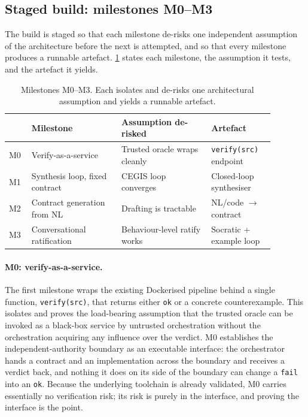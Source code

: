 \subsection{Staged build: milestones M0--M3}
\label{subsec:inst-milestones}

The build is staged so that each milestone de-risks one independent assumption of the architecture before the next is attempted, and so that every milestone produces a runnable artefact. \cref{tab:inst-milestones} states each milestone, the assumption it tests, and the artefact it yields.

\begin{table}[t]
  \centering
  \caption{Milestones M0--M3. Each isolates and de-risks one architectural assumption and yields a runnable artefact.}
  \label{tab:inst-milestones}
  \begin{tabular}{@{}p{0.07\linewidth}p{0.30\linewidth}p{0.30\linewidth}p{0.21\linewidth}@{}}
    \toprule
    & Milestone & Assumption de-risked & Artefact \\
    \midrule
    M0 & Verify-as-a-service & Trusted oracle wraps cleanly & \texttt{verify(src)} endpoint \\
    M1 & Synthesis loop, fixed contract & CEGIS loop converges & Closed-loop synthesiser \\
    M2 & Contract generation from NL & Drafting is tractable & NL/code $\rightarrow$ contract \\
    M3 & Conversational ratification & Behaviour-level ratify works & Socratic + example loop \\
    \bottomrule
  \end{tabular}
\end{table}

\paragraph{M0: verify-as-a-service.} The first milestone wraps the existing Dockerised pipeline behind a single function, \texttt{verify(src)}, that returns either \texttt{ok} or a concrete counterexample. This isolates and proves the load-bearing assumption that the trusted oracle can be invoked as a black-box service by untrusted orchestration without the orchestration acquiring any influence over the verdict. M0 establishes the independent-authority boundary as an executable interface: the orchestrator hands a contract and an implementation across the boundary and receives a verdict back, and nothing it does on its side of the boundary can change a \texttt{fail} into an \texttt{ok}. Because the underlying toolchain is already validated, M0 carries essentially no verification risk; its risk is purely in the interface, and proving the interface is the point.

